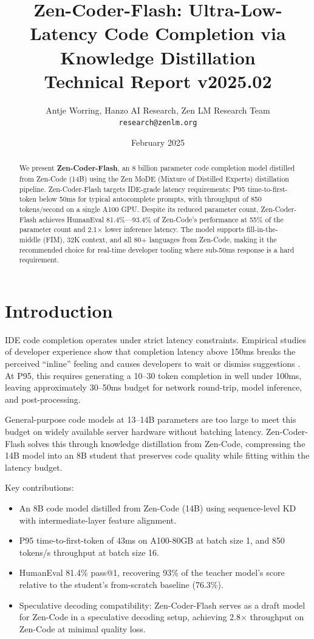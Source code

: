 \documentclass[11pt,a4paper]{article}
\title{\textbf{Zen-Coder-Flash: Ultra-Low-Latency Code Completion via Knowledge Distillation}\\
\large Technical Report v2025.02}
\author{Antje Worring, Hanzo AI Research, Zen LM Research Team\\
\texttt{research@zenlm.org}}
\date{February 2025}
\begin{document}
\maketitle

\begin{abstract}
We present \textbf{Zen-Coder-Flash}, an 8 billion parameter code completion model distilled
from Zen-Code (14B) using the Zen MoDE (Mixture of Distilled Experts) distillation pipeline.
Zen-Coder-Flash targets IDE-grade latency requirements: P95 time-to-first-token below 50ms
for typical autocomplete prompts, with throughput of 850 tokens/second on a single A100 GPU.
Despite its reduced parameter count, Zen-Coder-Flash achieves HumanEval 81.4\%---93.4\% of
Zen-Code's performance at 55\% of the parameter count and 2.1$\times$ lower inference latency.
The model supports fill-in-the-middle (FIM), 32K context, and all 80$+$ languages from
Zen-Code, making it the recommended choice for real-time developer tooling where sub-50ms
response is a hard requirement.
\end{abstract}

\tableofcontents
\newpage

\section{Introduction}

IDE code completion operates under strict latency constraints. Empirical studies of developer
experience show that completion latency above 150ms breaks the perceived ``inline'' feeling and
causes developers to wait or dismiss suggestions \cite{svyatkovskiy2021fast}. At P95, this
requires generating a 10--30 token completion in well under 100ms, leaving approximately 30--50ms
budget for network round-trip, model inference, and post-processing.

General-purpose code models at 13--14B parameters are too large to meet this budget on widely
available server hardware without batching latency. Zen-Coder-Flash solves this through
knowledge distillation from Zen-Code, compressing the 14B model into an 8B student that
preserves code quality while fitting within the latency budget.

Key contributions:

\begin{itemize}
  \item An 8B code model distilled from Zen-Code (14B) using sequence-level KD with
        intermediate-layer feature alignment.
  \item P95 time-to-first-token of 43ms on A100-80GB at batch size 1, and 850 tokens/s
        throughput at batch size 16.
  \item HumanEval 81.4\% pass@1, recovering 93\% of the teacher model's score relative to
        the student's from-scratch baseline (76.3\%).
  \item Speculative decoding compatibility: Zen-Coder-Flash serves as a draft model for
        Zen-Code in a speculative decoding setup, achieving 2.8$\times$ throughput on
        Zen-Code at minimal quality loss.
\end{itemize}
\end{document}
